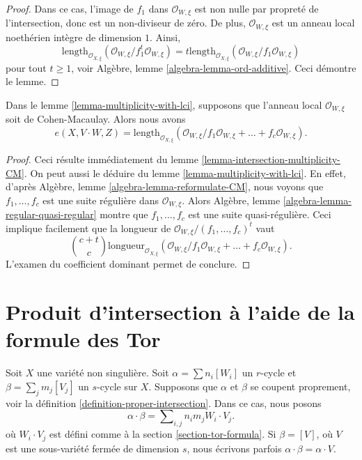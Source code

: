 \begin{proof}
Dans ce cas, l'image de $f_1$ dans $\mathcal{O}_{W, \xi}$ est non nulle par
propreté de l'intersection, donc est un non-diviseur de zéro. De plus,
$\mathcal{O}_{W, \xi}$ est un anneau local noethérien intègre de dimension $1$.
Ainsi,
$$
\text{length}_{\mathcal{O}_{X, \xi}}
(\mathcal{O}_{W, \xi}/f_1^t\mathcal{O}_{W, \xi}) =
t \text{length}_{\mathcal{O}_{X, \xi}}
(\mathcal{O}_{W, \xi}/f_1\mathcal{O}_{W, \xi})
$$
pour tout $t \geq 1$, voir Algèbre, lemme \ref{algebra-lemma-ord-additive}.
Ceci démontre le lemme.
\end{proof}

\begin{lemma}
\label{lemma-multiplicity-lci-CM}
Dans le lemme \ref{lemma-multiplicity-with-lci}, supposons que
l'anneau local $\mathcal{O}_{W, \xi}$ soit de Cohen-Macaulay. Alors nous
avons
$$
e(X, V \cdot W, Z) =
\text{length}_{\mathcal{O}_{X, \xi}} (\mathcal{O}_{W, \xi}/
f_1\mathcal{O}_{W, \xi} + \ldots + f_c\mathcal{O}_{W, \xi}).
$$
\end{lemma}

\begin{proof}
Ceci résulte immédiatement du lemme \ref{lemma-intersection-multiplicity-CM}.
On peut aussi le déduire du lemme \ref{lemma-multiplicity-with-lci}.
En effet, d'après Algèbre, lemme \ref{algebra-lemma-reformulate-CM},
nous voyons que $f_1, \ldots, f_c$ est une suite régulière dans
$\mathcal{O}_{W, \xi}$. Alors
Algèbre, lemme \ref{algebra-lemma-regular-quasi-regular} montre que
$f_1, \ldots, f_c$ est une suite quasi-régulière.
Ceci implique facilement que la longueur de
$\mathcal{O}_{W, \xi}/(f_1, \ldots, f_c)^t$ vaut
$$
{c + t \choose c}
\text{longueur}_{\mathcal{O}_{X, \xi}} (\mathcal{O}_{W, \xi}/
f_1\mathcal{O}_{W, \xi} + \ldots + f_c\mathcal{O}_{W, \xi}).
$$
L'examen du coefficient dominant permet de conclure.
\end{proof}


\section{Produit d'intersection à l'aide de la formule des Tor}
\label{section-intersection-product}

\noindent
Soit $X$ une variété non singulière. Soit
$\alpha = \sum n_i [W_i]$ un $r$-cycle et
$\beta = \sum_j m_j [V_j]$ un $s$-cycle sur $X$.
Supposons que $\alpha$ et $\beta$ se coupent proprement, voir
la définition \ref{definition-proper-intersection}.
Dans ce cas, nous posons
$$
\alpha \cdot \beta = \sum\nolimits_{i,j} n_i m_j W_i \cdot V_j.
$$
où $W_i \cdot V_j$ est défini comme à la section \ref{section-tor-formula}.
Si $\beta = [V]$, où $V$ est une sous-variété fermée de dimension $s$,
nous écrivons parfois $\alpha \cdot \beta = \alpha \cdot V$.

